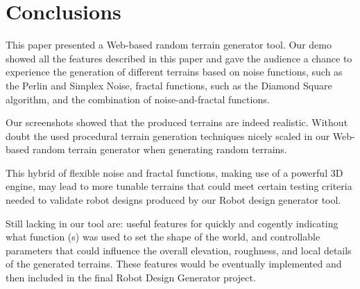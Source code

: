 \section{Conclusions} %
\label{sec:conclusions}

This paper presented a Web-based random terrain generator tool. Our demo showed all the features described in this paper and gave the audience a chance to experience the generation of different terrains based on noise functions, such as the Perlin and Simplex Noise, fractal functions, such as the Diamond Square algorithm, and the combination of noise-and-fractal functions. 

Our screenshots showed that the produced terrains are indeed realistic. Without doubt the used procedural terrain generation techniques nicely scaled in our Web-based random terrain generator when generating random terrains. 

This hybrid of flexible noise and fractal functions, making use of a powerful 3D engine, may lead to more tunable terrains that could meet certain testing criteria needed to validate robot designs produced by our Robot design generator tool. 

Still lacking in our tool are: useful features for quickly and cogently indicating what function (s) was used to set the shape of the world, and controllable parameters that could influence the overall elevation, roughness, and local details of the generated terrains. These features would be eventually implemented and then included in the final Robot Design Generator project. 


